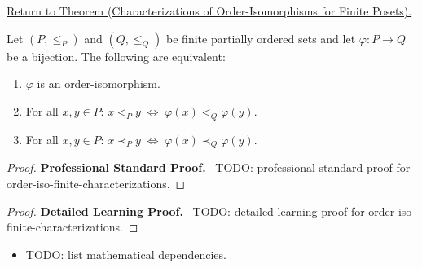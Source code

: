 \newpage
{}
\label{prf:order-iso-finite-characterizations}

\begin{remark*}[Return]
\hyperref[lem:order-iso-finite-characterizations]{Return to Theorem (Characterizations of Order-Isomorphisms for Finite Posets).}
\end{remark*}

\begin{theorem*}
Let $(P, \leq_P)$ and $(Q, \leq_Q)$ be finite partially ordered sets and
let $\varphi : P \to Q$ be a bijection.  The following are equivalent:
\begin{enumerate}
  \item $\varphi$ is an order-isomorphism.
  \item For all $x, y \in P$:\; $x <_P y \;\Longleftrightarrow\; \varphi(x) <_Q \varphi(y)$.
  \item For all $x, y \in P$:\; $x \prec_P y \;\Longleftrightarrow\; \varphi(x) \prec_Q \varphi(y)$.
\end{enumerate}
\end{theorem*}

\begin{proof}
\textbf{Professional Standard Proof.}~
TODO: professional standard proof for order-iso-finite-characterizations.
\end{proof}

\begin{proof}
\textbf{Detailed Learning Proof.}~
TODO: detailed learning proof for order-iso-finite-characterizations.
\end{proof}

\begin{remark*}
\end{remark*}

\begin{dependencies}
\begin{itemize}
  \item TODO: list mathematical dependencies.
\end{itemize}
\end{dependencies}

\clearpage
